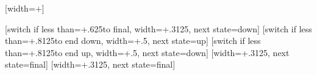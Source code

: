 {%
  [width=+\pgfdecoratedinputsegmentremainingdistance]
  {
    \pgfpathcurveto
    {\pgfqpoint{\pgfdecorationsegmentaspect\pgfdecoratedinputsegmentremainingdistance}{\pgfdecorationsegmentamplitude}}
    {\pgfpointadd{\pgfqpoint{\pgfdecoratedinputsegmentremainingdistance}{0pt}}
       {\pgfqpoint{-\pgfdecorationsegmentaspect\pgfdecoratedinputsegmentremainingdistance}{\pgfdecorationsegmentamplitude}}}
    {\pgfqpoint{\pgfdecoratedinputsegmentremainingdistance}{0pt}}
  }%
  {}%
}%




{%
  [switch if less than=+.625\pgfdecorationsegmentlength to final,
                  width=+.3125\pgfdecorationsegmentlength,
                  next state=down]
  {
    \pgfpathcurveto
    {\pgfqpoint{.125\pgfdecorationsegmentlength}{0pt}}
    {\pgfqpoint{.1875\pgfdecorationsegmentlength}{\pgfdecorationsegmentamplitude}}
    {\pgfqpoint{.3125\pgfdecorationsegmentlength}{\pgfdecorationsegmentamplitude}}
  }%
  [switch if less than=+.8125\pgfdecorationsegmentlength to end down,
               width=+.5\pgfdecorationsegmentlength,
               next state=up]
  {
    \pgfpathcosine{\pgfqpoint{.25\pgfdecorationsegmentlength}{-1\pgfdecorationsegmentamplitude}}
    \pgfpathsine{\pgfqpoint{.25\pgfdecorationsegmentlength}{-1\pgfdecorationsegmentamplitude}}
  }%
  [switch if less than=+.8125\pgfdecorationsegmentlength to end up,
             width=+.5\pgfdecorationsegmentlength,
             next state=down]
  {
    \pgfpathcosine{\pgfqpoint{.25\pgfdecorationsegmentlength}{\pgfdecorationsegmentamplitude}}
    \pgfpathsine{\pgfqpoint{.25\pgfdecorationsegmentlength}{\pgfdecorationsegmentamplitude}}
  }%
  [width=+.3125\pgfdecorationsegmentlength,
                   next state=final]
  {
    \pgfpathcurveto
    {\pgfqpoint{.125\pgfdecorationsegmentlength}{\pgfdecorationsegmentamplitude}}
    {\pgfqpoint{.1875\pgfdecorationsegmentlength}{0pt}}
    {\pgfqpoint{.3125\pgfdecorationsegmentlength}{0pt}}
  }%
  [width=+.3125\pgfdecorationsegmentlength,
                 next state=final]
  {
    \pgfpathcurveto
    {\pgfqpoint{.125\pgfdecorationsegmentlength}{-\pgfdecorationsegmentamplitude}}
    {\pgfqpoint{.1875\pgfdecorationsegmentlength}{0pt}}
    {\pgfqpoint{.3125\pgfdecorationsegmentlength}{0pt}}
  }%
  {
    \pgfpathlineto{\pgfpointdecoratedpathlast}
  }%
}%



